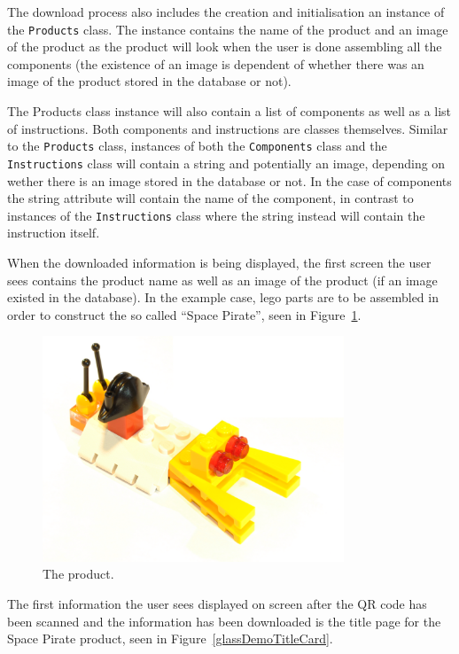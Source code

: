 The download process also includes the creation and initialisation an instance of the \texttt{Products} class. The instance contains the name of the product and an image of the product as the product will look when the user is done assembling all the components (the existence of an image is dependent of whether there was an image of the product stored in the database or not).

The Products class instance will also contain a list of components as well as a list of instructions. Both components and instructions are classes themselves. Similar to the \texttt{Products} class, instances of both the \texttt{Components} class and the \texttt{Instructions} class will contain a string and potentially an image, depending on wether there is an image stored in the database or not. In the case of components the string attribute will contain the name of the component, in contrast to instances of the \texttt{Instructions} class where the string instead will contain the instruction itself.

When the downloaded information is being displayed, the first screen the user sees contains the product name as well as an image of the product (if an image existed in the database). In the example case, lego parts are to be assembled in order to construct the so called ``Space Pirate'', seen in Figure~\ref{glassDemoRaw}.

	\begin{figure}[ht!]
		\centering
		\includegraphics[width=90mm]{images/rawImages/BILD_6}
		\caption{The product.}
		\label{glassDemoRaw}
	\end{figure}

The first information the user sees displayed on screen after the QR code has been scanned and the information has been downloaded is the title page for the Space Pirate product, seen in Figure~\ref{glassDemoTitleCard}.

